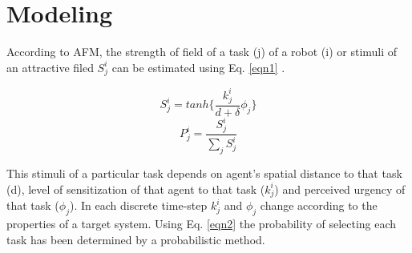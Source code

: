 \documentclass{llncs}
\begin{document}
\section{Modeling}
\label{sec:model}
\vspace{2mm}
According to AFM, the strength of field of a task (j) of a robot (i) or stimuli of an attractive filed $S_{j}^{i}$ can be estimated using Eq. \ref{eqn1} .
\addtolength{\abovedisplayskip}{-10mm} 
\begin{scriptsize}
\begin{multicols}{2} 
\begin{equation}
S_{j}^{i} = tanh\{\frac{k_{j}^{i}}{d+\delta } \phi _{j}\}
\label{eqn1}
\end{equation}
\vspace*{0.25cm}
\begin{equation}
P_{j}^{i} = \frac{S_{j}^{i}}{\sum_{j}^{}S_{j}^{i}}
\label{eqn2}
\end{equation}
\end{multicols}
\end{scriptsize}
\vspace{2mm}
This stimuli of a particular task depends on agent's spatial distance to that task (d), level of sensitization of that agent to that task ($k_{j}^{i}$) and perceived urgency of that task ($\phi _{j}$). In each discrete time-step $k_{j}^{i}$ and $\phi _{j}$ change according to the properties of a target system. Using Eq. \ref{eqn2} the probability of selecting each task has been determined by a probabilistic method.
\addtolength{\floatsep}{-25mm}
\end{document}
